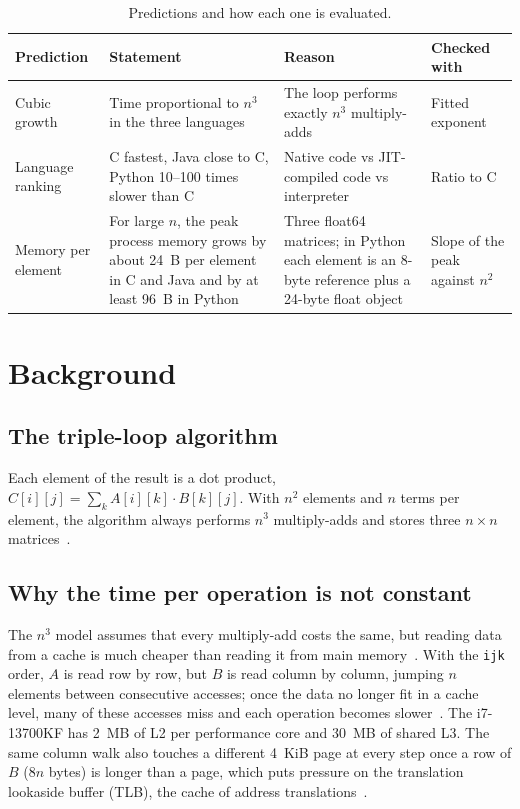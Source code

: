 \documentclass[12pt,a4paper]{article}
\begin{document}
\begin{table}[htbp]
\centering
\small
\begin{tabular}{p{2.0cm}p{5.4cm}p{4.0cm}p{2.6cm}}
\toprule
\textbf{Prediction} & \textbf{Statement} & \textbf{Reason} & \textbf{Checked with} \\
\midrule
Cubic growth & Time proportional to $n^3$ in the three languages & The loop performs
exactly $n^3$ multiply-adds & Fitted exponent \\
\addlinespace
Language ranking & C fastest, Java close to C, Python 10--100 times slower than C &
Native code vs JIT-compiled code vs interpreter & Ratio to C \\
\addlinespace
Memory per element & For large $n$, the peak process memory grows by about 24~B per
element in C and Java and by at least 96~B in Python & Three float64 matrices; in Python
each element is an 8-byte reference plus a 24-byte float object & Slope of the peak
against $n^2$ \\
\bottomrule
\end{tabular}
\caption{Predictions and how each one is evaluated.}
\label{tab:predictions}
\end{table}

\section{Background}

\subsection{The triple-loop algorithm}

Each element of the result is a dot product, $C[i][j] = \sum_k A[i][k] \cdot B[k][j]$.
With $n^2$ elements and $n$ terms per element, the algorithm always performs $n^3$
multiply-adds and stores three $n \times n$ matrices~\cite{cormen2009}.

\subsection{Why the time per operation is not constant}

The $n^3$ model assumes that every multiply-add costs the same, but reading data from a
cache is much cheaper than reading it from main memory~\cite{hennessy2019}. With the
\texttt{ijk} order, $A$ is read row by row, but $B$ is read column by column, jumping
$n$ elements between consecutive accesses; once the data no longer fit in a cache level,
many of these accesses miss and each operation becomes slower~\cite{hennessy2019}. The
i7-13700KF has 2~MB of L2 per performance core and 30~MB of shared L3. The same column
walk also touches a different 4~KiB page at every step once a row of $B$ ($8n$ bytes) is
longer than a page, which puts pressure on the translation lookaside buffer (TLB), the
cache of address translations~\cite{hennessy2019}.
\end{document}
